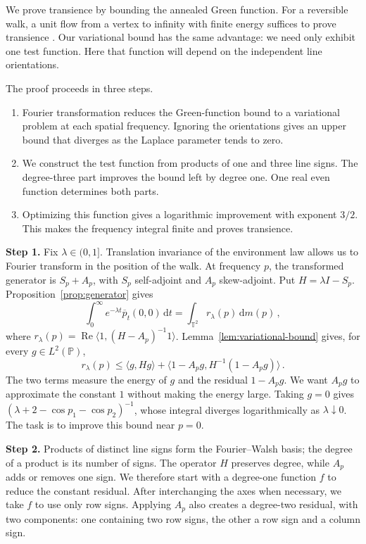 \documentclass[11pt]{amsart}
\theoremstyle{plain}
\theoremstyle{definition}
\newcommand{\T}{\mathbb T}
\renewcommand{\P}{\mathbb P}
\newcommand{\1}{\mathbf 1}
\newcommand{\ip}[2]{\langle #1,#2\rangle}
\newcommand{\dd}{\,\mathrm d}
\begin{document}
We prove transience by bounding the annealed Green function.  For a
reversible walk, a unit flow from a vertex to infinity with finite energy
suffices to prove transience
\citep*[Theorem~2.11]{LP16}.  Our variational bound has the same advantage:
we need only exhibit one test function.  Here that function will depend on
the independent line orientations.

The proof proceeds in three steps.
\begin{enumerate}[label=\textup{(\arabic*)}]
\item Fourier transformation reduces the Green-function bound to a
variational problem at each spatial frequency.  Ignoring the orientations
gives an upper bound that diverges as the Laplace parameter tends to zero.
\item We construct the test function from products of one and three line
signs.  The degree-three part improves the bound left by degree one.
One real even function determines both parts.
\item Optimizing this function gives a logarithmic improvement with exponent
$3/2$.  This makes the frequency integral finite and proves transience.
\end{enumerate}

\medskip
\noindent\textbf{Step 1.}  Fix $\lambda\in(0,1]$.  Translation invariance of the
environment law allows us to Fourier transform in the position of the walk.
At frequency $p$, the transformed generator is $S_p+A_p$, with $S_p$
self-adjoint and $A_p$ skew-adjoint.  Put $H=\lambda I-S_p$.
Proposition~\ref{prop:generator} gives
\[
  \int_0^\infty e^{-\lambda t}\overline p_t(0,0)\dd t
  =\int_{\T^2}r_\lambda(p)\dd m(p)\, ,
\]
where $r_\lambda(p)=\operatorname{Re}\ip1{(H-A_p)^{-1}1}$.
Lemma~\ref{lem:variational-bound} gives, for every $g\in L^2(\P)$,
\begin{equation}\label{eq:overview-bound}
  r_\lambda(p)\leq
  \ip g{Hg}+\ip{1-A_pg}{H^{-1}(1-A_pg)}\, .
\end{equation}
The two terms measure the energy of $g$ and the residual $1-A_pg$.
We want $A_pg$ to approximate the constant $1$ without making the energy
large.  Taking $g=0$ gives
$(\lambda+2-\cos p_1-\cos p_2)^{-1}$, whose integral diverges logarithmically
as $\lambda\downarrow0$.  The task is to improve this bound near $p=0$.

\medskip
\noindent\textbf{Step 2.}  Products of distinct line signs form the
Fourier--Walsh basis; the degree of a product is its number of signs.
The operator $H$ preserves degree, while $A_p$ adds or removes one sign.
We therefore start with a degree-one function $f$ to reduce the constant
residual.  After interchanging the axes when necessary, we take $f$ to use
only row signs.  Applying $A_p$ also creates a degree-two residual, with
two components: one containing two row signs, the other a row sign and a
column sign.
\end{document}
